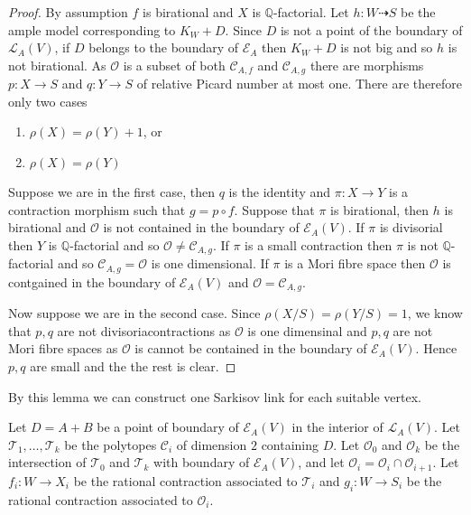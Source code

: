 \documentclass{article}
\begin{document}
\begin{proof}
 By assumption $f$  is birational and $X$  is $\mathbb{Q}$-factorial. Let $h: W \dashrightarrow S$ be the ample model corresponding to  $K_{W}+D$. Since $D$  is not a point of the boundary of $\mathcal{L}_{A}(V)$,  if $D$ belongs to the boundary of $\mathcal{E}_{A}$ then $K_{W}+D$ is not big and so $h$  is not birational. As $\mathcal{O}$   is a subset of both $\mathcal{C}_{A,f}$ and $\mathcal{C}_{A,g}$ there are morphisms $p: X\to S $ and  $q:Y\to S$ 
of relative Picard number at most one. There are therefore only two cases
\begin{enumerate}
  \item $\rho (X)=\rho(Y)+1$, or 
  \item $\rho(X)=\rho(Y)$
\end{enumerate}
Suppose we are in the first case, then $q$ is the identity and $\pi:X\to Y$  is a contraction morphism such that $
g=p \circ f$. Suppose that $\pi$ is birational, then $ h $ is birational and $\mathcal{O}$ is not contained in the boundary of  $\mathcal{E}_{A}(V)$. If $\pi$ is divisorial then $Y$ is $\mathbb{Q}$-factorial and so $\mathcal{O} \neq \mathcal{C}_{A,g}$. If $\pi $ is a small contraction then $\pi $ is not $\mathbb{Q}$-factorial and so $\mathcal{C}_{A,g}=\mathcal{O}$ is one dimensional. If $\pi $ is a Mori fibre space then $\mathcal{O} $ is contgained in the boundary of $\mathcal{E}_{A}(V)$ and $\mathcal{O} = \mathcal{C}_{A,g}$.

Now suppose we are in the second case. Since $\rho(X/S)=\rho(Y/S)=1$, we know that $p,q$ are not divisoriacontractions as $\mathcal{O}$ is one dimensinal and $p,q $ are not Mori fibre spaces as $\mathcal{O} $ is cannot be contained in the boundary of $\mathcal{E}_{A}(V)$. Hence  $p,q$ are small and the the rest is clear.
\end{proof}
By this lemma we can construct one Sarkisov link for each suitable vertex.

Let $ D=A+B $ be a point of boundary of $ \mathcal{E}_A(V) $ in the interior of $ \mathcal{L}_A(V) $. Let $ \mathcal{T}_1, \ldots, \mathcal{T}_k $ be the polytopes $ \mathcal{C}_i $ of dimension $ 2 $ containing $ D $. Let $ \mathcal{O}_0 $ and $ \mathcal{O}_k $ be the intersection of $ \mathcal{T}_0 $ and $ \mathcal{T}_k $ with boundary of $ \mathcal{E}_A(V) $, and let $ \mathcal{O}_i=\mathcal{O}_i\cap\mathcal{O}_{i+1} $. Let $ f_i:W\to X_i $ be the rational contraction associated to $ \mathcal{T}_i $ and $ g_i:W\to S_i $ be the rational contraction associated to $ \mathcal{O}_i $.
\end{document}
